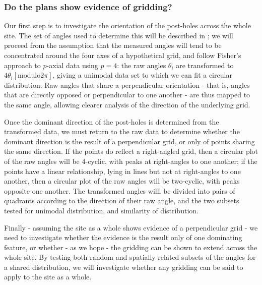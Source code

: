 \documentclass[../../ArchStats.tex]{subfiles}
\begin{document}
\subsubsection{Do the plans show evidence of gridding?}


Our first step is to investigate the orientation of the post-holes across the whole site. The set of angles used to determine this will be described in ; we will proceed from the assumption that the measured angles will tend to be concentrated around the four axes of a hypothetical grid, and follow Fisher's approach to $p$-axial data \cite{Fisher1993} using $p=4$: the raw angles $\theta_i$ are transformed to $4\theta_i \left[ \text{modulo} 2\pi \right]$, giving a unimodal data set to which we can fit a circular distribution. Raw angles that share a perpendicular orientation - that is, angles that are directly opposed or perpendicular to one another - are thus mapped to the same angle, allowing clearer analysis of the direction of the underlying grid.

Once the dominant direction of the post-holes is determined from the transformed data, we must return to the raw data to determine whether the dominant direction is the result of a perpendicular grid, or only of points sharing the same direction. If the points do reflect a right-angled grid, then a circular plot of the raw angles will be 4-cyclic, with peaks at right-angles to one another; if the points have a linear relationship, lying in lines but not at right-angles to one another, then a circular plot of the raw angles will be two-cyclic, with peaks opposite one another. The transformed angles willl be divided into pairs of quadrants according to the direction of their raw angle, and the two subsets tested for unimodal distribution, and similarity of distribution.


Finally - assuming the site as a whole shows evidence of a perpendicular grid - we need to investigate whether the evidence is the result only of one dominating feature, or whether - as we hope - the gridding can be shown to extend across the whole site. By testing both random and spatially-related subsets of the angles for a shared distribution, we will investigate whether any gridding can be said to apply to the site as a whole.
\end{document}
